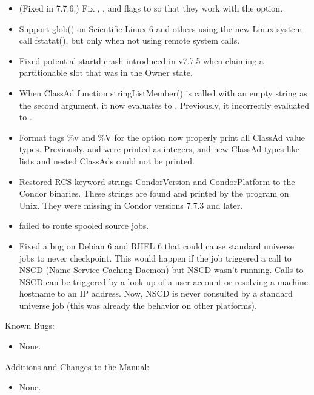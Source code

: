 \begin{itemize}

\item (Fixed in 7.7.6.) Fix , , and 
flags to  so that they work with the  option.

\item Support glob() on Scientific Linux 6 and others using the new
Linux system call fstatat(), but only when not using remote system calls.

\item Fixed potential startd crash introduced in v7.7.5 when claiming 
a partitionable slot that was in the Owner state. 

\item When ClassAd function stringListMember() is called with an empty
string as the second argument, it now evaluates to .
Previously, it incorrectly evaluated to .

\item Format tags \%v and \%V for the  option now properly
print all ClassAd value types. Previously,  and 
were printed as integers, and new ClassAd types like lists and nested
ClassAds could not be printed.

\item Restored RCS keyword strings CondorVersion and CondorPlatform to
the Condor binaries. These strings are found and printed by the 
 program on Unix. They were missing in Condor versions 7.7.3
and later.

\item {} failed to route spooled source jobs.

\item Fixed a bug on Debian 6 and RHEL 6 that could cause standard
universe jobs to never checkpoint. This would happen if the job
triggered a call to NSCD (Name Service Caching Daemon) but NSCD 
wasn't running. 
Calls to NSCD can be triggered by a look up of a user account or
resolving a machine hostname to an IP address.
Now, NSCD is never consulted by a standard universe
job (this was already the behavior on other platforms).

\end{itemize}

\noindent Known Bugs:

\begin{itemize}

\item None.

\end{itemize}

\noindent Additions and Changes to the Manual:

\begin{itemize}

\item None.

\end{itemize}


